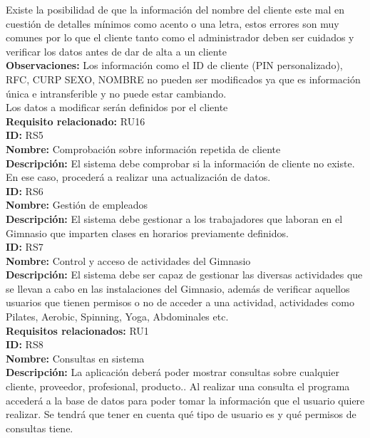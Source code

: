 Existe la posibilidad de que la información del nombre del cliente este mal en cuestión de detalles mínimos como acento o una letra, estos errores son muy comunes por lo que el cliente tanto como el administrador deben ser cuidados y verificar los datos antes de dar de alta a un cliente\\

\textbf{Observaciones: }
Los información como el ID de cliente (PIN personalizado), RFC, CURP SEXO, NOMBRE no pueden ser modificados ya que es información única e intransferible y no puede estar cambiando.\\

Los datos a modificar serán definidos por el cliente \\
\textbf{Requisito relacionado:} RU16\\
 

  
\textbf{ID:} RS5\\
\textbf{Nombre:} Comprobación sobre información repetida de cliente\\
\textbf{Descripción:} El sistema debe comprobar si la información de cliente no existe. En ese caso, procederá a realizar una actualización de datos. \\

\textbf{ID:} RS6\\
\textbf{Nombre:} Gestión de empleados \\
\textbf{Descripción:} El sistema debe gestionar a los trabajadores que laboran en el Gimnasio que imparten clases en horarios previamente definidos. \\ 

\textbf{ID:} RS7\\
\textbf{Nombre:} Control y acceso de actividades del Gimnasio \\
\textbf{Descripción:} El sistema debe ser capaz de gestionar las diversas actividades que se llevan a cabo en las instalaciones del Gimnasio, además de  verificar aquellos  usuarios que tienen permisos o no de acceder a una actividad, actividades como Pilates, Aerobic, Spinning, Yoga, Abdominales etc.\\
\textbf{Requisitos relacionados:} RU1\\

\textbf{ID:} RS8\\
\textbf{Nombre:} Consultas en sistema\\
\textbf{Descripción:} La aplicación deberá poder mostrar consultas sobre cualquier cliente, proveedor, profesional, producto.. Al realizar una consulta el programa accederá a la base de datos para poder tomar la información que el usuario quiere realizar. Se tendrá que tener en cuenta qué tipo de usuario es y qué permisos de consultas tiene.\\

